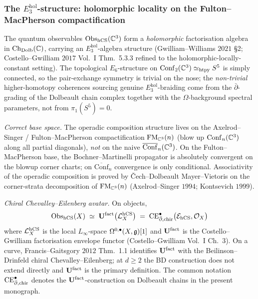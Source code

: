 \subsubsection{The $E_3^{\mathrm{hol}}$-structure: holomorphic locality
on the Fulton--MacPherson compactification}

\begin{theorem}
\label{wn:thm:spine-E3-hol-structure}
The quantum observables $\mathrm{Obs}_{\mathrm{hCS}}(\mathbb{C}^3)$ form a \emph{holomorphic}
factorisation algebra in $\mathrm{Ch}_{\mathrm{Dolb}}(\mathbb{C})$, carrying
an $E_3^{\mathrm{hol}}$-algebra structure (Gwilliam--Williams $2021$
\S 2; Costello--Gwilliam $2017$ Vol.~I Thm.~5.3.3 refined to the
holomorphic-locally-constant setting). The topological $E_6$-structure
on $\mathrm{Conf}_2(\mathbb{C}^3) \simeq_\mathrm{htpy} S^5$ is simply
connected, so the pair-exchange symmetry is trivial on the nose; the
\emph{non-trivial} higher-homotopy coherences sourcing genuine
$E_3^{\mathrm{hol}}$-braiding come from the $\bar\partial$-grading of
the Dolbeault chain complex together with the $\Omega$-background
spectral parameters, not from $\pi_1(S^5) = 0$.

\emph{Correct base space.} The operadic composition structure lives on
the Axelrod--Singer / Fulton--MacPherson compactification
$\mathrm{FM}_{\mathbb{C}^3}(n)$ (blow up $\mathrm{Conf}_n(\mathbb{C}^3)$ along all partial
diagonals), \emph{not} on the naive
$\overline{\mathrm{Conf}}_n(\mathbb{C}^3)$. On the Fulton--MacPherson base,
the Bochner--Martinelli propagator is absolutely convergent on the
blowup corner charts; on $\overline{\mathrm{Conf}}_n$ convergence is
only conditional. Associativity of the operadic composition is proved
by \v Cech--Dolbeault Mayer--Vietoris on the corner-strata decomposition
of $\mathrm{FM}_{\mathbb{C}^3}(n)$ (Axelrod--Singer $1994$; Kontsevich $1999$).

\emph{Chiral Chevalley--Eilenberg avatar.} On objects,
\[
\mathrm{Obs}_{\mathrm{hCS}}(X) \;\simeq\; \mathbf{U}^{\mathrm{fact}}\bigl(\mathcal{L}^{\mathrm{hCS}}_X\bigr)
\;=\; \mathrm{CE}^{\bullet}_{\bar\partial,\mathrm{chir}}\bigl(\mathcal{E}_{\mathrm{hCS}}, \mathcal{O}_X\bigr)
\]
where $\mathcal{L}^{\mathrm{hCS}}_X$ is the local $L_\infty$-space
$\Omega^{0,\bullet}(X, \mathfrak{g})[1]$ and $\mathbf{U}^{\mathrm{fact}}$ is the
Costello--Gwilliam factorisation envelope functor
(Costello--Gwilliam Vol.~I Ch.~3). On a curve, Francis--Gaitsgory
$2012$ Thm.~1.1 identifies $\mathbf{U}^{\mathrm{fact}}$ with the Beilinson--Drinfeld
chiral Chevalley--Eilenberg; at $d \geq 2$ the BD construction does
not extend directly and $\mathbf{U}^{\mathrm{fact}}$ is the primary definition. The
common notation $\mathrm{CE}^{\bullet}_{\bar\partial,\mathrm{chir}}$ denotes the $\mathbf{U}^{\mathrm{fact}}$-construction on Dolbeault
chains in the present monograph.
\end{theorem}

